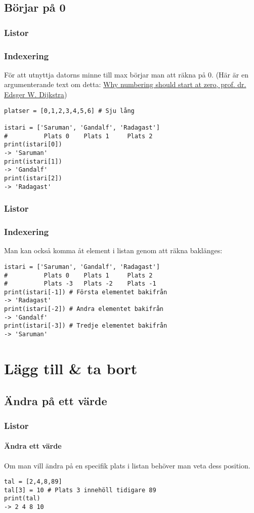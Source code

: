 \documentclass[aspectratio=169]{beamer}
\begin{document}
\subsection{Börjar på 0}

\begin{frame}[fragile]
\frametitle{Listor}
\frametitle{Indexering}

För att utnyttja datorns minne till max börjar man att räkna på 0. (Här är en argumenterande text om detta: \href{https://www.cs.utexas.edu/users/EWD/ewd08xx/EWD831.PDF}{Why numbering should start at zero,  prof. dr. Edsger W. Dijkstra})

\begin{lstlisting}
platser = [0,1,2,3,4,5,6] # Sju lång

istari = ['Saruman', 'Gandalf', 'Radagast']
#          Plats 0    Plats 1     Plats 2
print(istari[0])
-> 'Saruman'
print(istari[1])
-> 'Gandalf'
print(istari[2])
-> 'Radagast'
\end{lstlisting}

\end{frame}

\begin{frame}[fragile]
\frametitle{Listor}
\frametitle{Indexering}

Man kan också komma åt element i listan genom att räkna baklänges:

\begin{lstlisting}
istari = ['Saruman', 'Gandalf', 'Radagast']
#          Plats 0    Plats 1     Plats 2
#          Plats -3   Plats -2    Plats -1
print(istari[-1]) # Första elementet bakifrån
-> 'Radagast'
print(istari[-2]) # Andra elementet bakifrån
-> 'Gandalf'
print(istari[-3]) # Tredje elementet bakifrån
-> 'Saruman'
\end{lstlisting}

\end{frame}

\section{Lägg till \& ta bort}

\subsection{Ändra på ett värde}

\begin{frame}[fragile]
	\frametitle{Listor}
	\framesubtitle{Ändra ett värde}
	
	Om man vill ändra på en specifik plats i listan behöver man veta dess position.
	
	\begin{lstlisting}
tal = [2,4,8,89]
tal[3] = 10 # Plats 3 innehöll tidigare 89
print(tal)
-> 2 4 8 10
	\end{lstlisting}
	
	
\end{frame}
\end{document}
